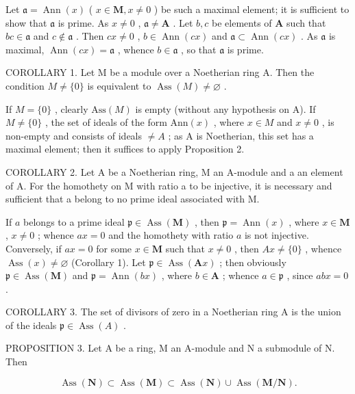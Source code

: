 Let \(\mathfrak{a} = \operatorname{Ann}(x)\) ( \(x \in \mathbf{M}, x \neq 0\) ) be such a maximal element; it is sufficient to show that \(\mathfrak{a}\) is prime. As \(x \neq 0\) , \(\mathfrak{a} \neq \mathbf{A}\) . Let \(b, c\) be elements of \(\mathbf{A}\) such that \(bc \in \mathfrak{a}\) and \(c \notin \mathfrak{a}\) . Then \(cx \neq 0\) , \(b \in \operatorname{Ann}(cx)\) and \(\mathfrak{a} \subset \operatorname{Ann}(cx)\) . As \(\mathfrak{a}\) is maximal, \(\operatorname{Ann}(cx) = \mathfrak{a}\) , whence \(b \in \mathfrak{a}\) , so that \(\mathfrak{a}\) is prime.

COROLLARY 1. Let M be a module over a Noetherian ring A. Then the condition \(M \neq \{0\}\) is equivalent to \(\operatorname{Ass}(M) \neq \varnothing\) .

If \(M = \{0\}\) , clearly \(\text{Ass}(M)\) is empty (without any hypothesis on A). If \(M \neq \{0\}\) , the set of ideals of the form \(\text{Ann}(x)\) , where \(x \in M\) and \(x \neq 0\) , is non-empty and consists of ideals \(\neq A\) ; as A is Noetherian, this set has a maximal element; then it suffices to apply Proposition 2.

COROLLARY 2. Let A be a Noetherian ring, M an A-module and a an element of A. For the homothety on M with ratio a to be injective, it is necessary and sufficient that a belong to no prime ideal associated with M.

If \(a\) belongs to a prime ideal \(\mathfrak{p} \in \operatorname{Ass}(\mathbf{M})\) , then \(\mathfrak{p} = \operatorname{Ann}(x)\) , where \(x \in \mathbf{M}\) , \(x \neq 0\) ; whence \(ax = 0\) and the homothety with ratio \(a\) is not injective. Conversely, if \(ax = 0\) for some \(x \in \mathbf{M}\) such that \(x \neq 0\) , then \(Ax \neq \{0\}\) , whence \(\operatorname{Ass}(x) \neq \varnothing\) (Corollary 1). Let \(\mathfrak{p} \in \operatorname{Ass}(\mathbf{A}x)\) ; then obviously \(\mathfrak{p} \in \operatorname{Ass}(\mathbf{M})\) and \(\mathfrak{p} = \operatorname{Ann}(bx)\) , where \(b \in \mathbf{A}\) ; whence \(a \in \mathfrak{p}\) , since \(abx = 0\) .

COROLLARY 3. The set of divisors of zero in a Noetherian ring A is the union of the ideals \(\mathfrak{p} \in \operatorname{Ass}(A)\) .

PROPOSITION 3. Let A be a ring, M an A-module and N a submodule of N. Then

\[
\operatorname{Ass} (\mathbf {N}) \subset \operatorname{Ass} (\mathbf {M}) \subset \operatorname{Ass} (\mathbf {N}) \cup \operatorname{Ass} (\mathbf {M} / \mathbf {N}).\tag{2}
\]


